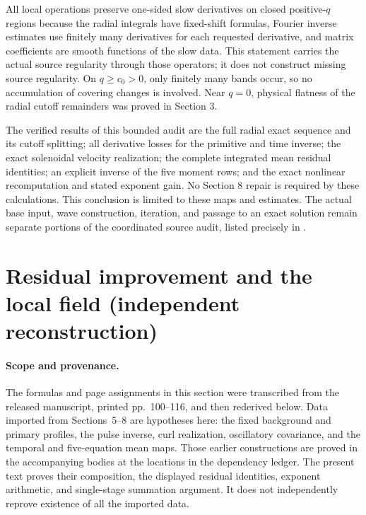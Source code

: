 \documentclass[10pt,a4paper]{article}
\begin{document}
All local operations preserve one-sided slow derivatives on closed positive-\(q\) regions because the radial integrals have fixed-shift formulas, Fourier inverse estimates use finitely many derivatives for each requested derivative, and matrix coefficients are smooth functions of the slow data. This statement carries the actual source regularity through those operators; it does not construct missing source regularity. On \(q\ge c_0>0\), only finitely many bands occur, so no accumulation of covering changes is involved. Near \(q=0\), physical flatness of the radial cutoff remainders was proved in Section 3.

The verified results of this bounded audit are the full radial exact sequence and its cutoff splitting; all derivative losses for the primitive and time inverse; the exact solenoidal velocity realization; the complete integrated mean residual identities; an explicit inverse of the five moment rows; and the exact nonlinear recomputation and stated exponent gain. No Section 8 repair is required by these calculations. This conclusion is limited to these maps and estimates. The actual base input, wave construction, iteration, and passage to an exact solution remain separate portions of the coordinated source audit, listed precisely in \texttt{}.


\section{Residual improvement and the local field (independent reconstruction)}
\label{sec:stage9}

\paragraph{Scope and provenance.}
The formulas and page assignments in this section were transcribed from the
released manuscript, printed pp.~100--116, and then rederived below.  Data
imported from Sections~5--8 are hypotheses here: the fixed background and
primary profiles, the pulse inverse, curl realization, oscillatory covariance,
and the temporal and five-equation mean maps. Those earlier constructions
are proved in the accompanying bodies at the locations in the dependency
ledger. The present text proves their composition, the displayed residual
identities, exponent arithmetic, and single-stage summation argument.
It does not independently reprove existence of all the imported data.
\end{document}
